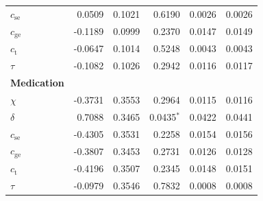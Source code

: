\begin{longtable}{l r r r r r}
        \hspace{4mm} $c_{\text{se}}$ & 0.0509 & 0.1021 & 0.6190 & 0.0026 & 0.0026 \\
        \hspace{4mm} $c_{\text{ge}}$ & -0.1189 & 0.0999 & 0.2370 & 0.0147 & 0.0149 \\
        \hspace{4mm} $c_{\text{t}}$ & -0.0647 & 0.1014 & 0.5248 & 0.0043 & 0.0043 \\
        \hspace{4mm} $\tau$ & -0.1082 & 0.1026 & 0.2942 & 0.0116 & 0.0117 \\
        \midrule
        \textbf{Medication} & & & & & \\
        \hspace{4mm} $\chi$ & -0.3731 & 0.3553 & 0.2964 & 0.0115 & 0.0116 \\
        \hspace{4mm} $\delta$ & 0.7088 & 0.3465 & 0.0435$^{*}$ & 0.0422 & 0.0441 \\
        \hspace{4mm} $c_{\text{se}}$ & -0.4305 & 0.3531 & 0.2258 & 0.0154 & 0.0156 \\
        \hspace{4mm} $c_{\text{ge}}$ & -0.3807 & 0.3453 & 0.2731 & 0.0126 & 0.0128 \\
        \hspace{4mm} $c_{\text{t}}$ & -0.4196 & 0.3507 & 0.2345 & 0.0148 & 0.0151 \\
        \hspace{4mm} $\tau$ & -0.0979 & 0.3546 & 0.7832 & 0.0008 & 0.0008 \\
    \end{longtable}
\endgroup